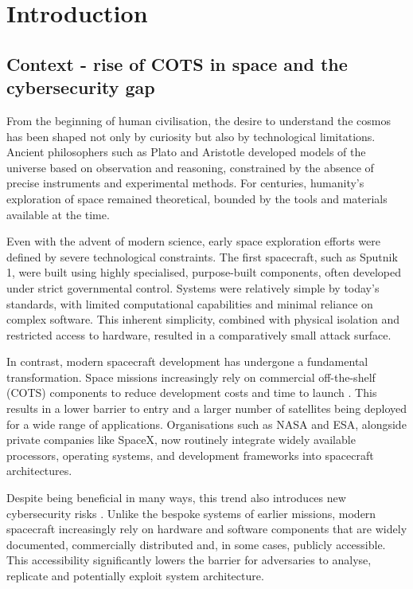 \chapter{Introduction}
\label{chapter:intro}

\section{Context - rise of COTS in space and the cybersecurity gap}
\label{section:intro-context}

From the beginning of human civilisation, the desire to understand the cosmos has been shaped not only by curiosity but also by technological limitations. Ancient philosophers such as Plato and Aristotle developed models of the universe based on observation and reasoning, constrained by the absence of precise instruments and experimental methods. For centuries, humanity's exploration of space remained theoretical, bounded by the tools and materials available at the time.

Even with the advent of modern science, early space exploration efforts were defined by severe technological constraints. The first spacecraft, such as Sputnik 1, were built using highly specialised, purpose-built components, often developed under strict governmental control. Systems were relatively simple by today's standards, with limited computational capabilities and minimal reliance on complex software. This inherent simplicity, combined with physical isolation and restricted access to hardware, resulted in a comparatively small attack surface.

In contrast, modern spacecraft development has undergone a fundamental transformation. Space missions increasingly rely on commercial off-the-shelf (COTS) components to reduce development costs and time to launch \cite{ESA_2020}. This results in a lower barrier to entry and a larger number of satellites being deployed for a wide range of applications. Organisations such as NASA and ESA, alongside private companies like SpaceX, now routinely integrate widely available processors, operating systems, and development frameworks into spacecraft architectures.

Despite being beneficial in many ways, this trend also introduces new cybersecurity risks \cite{Moutafis_2025, space_odyssey_2023, orbital_shield_2024}. Unlike the bespoke systems of earlier missions, modern spacecraft increasingly rely on hardware and software components that are widely documented, commercially distributed and, in some cases, publicly accessible. This accessibility significantly lowers the barrier for adversaries to analyse, replicate and potentially exploit system architecture.

